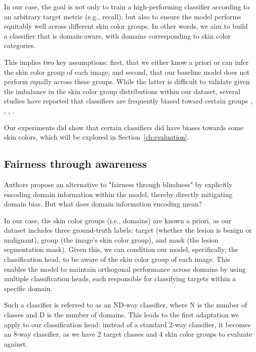 In our case, the goal is not only to train a high-performing classifier according to an arbitrary target metric (e.g., recall), but also to ensure the model performs equitably well across different skin color groups. In other words, we aim to build a classifier that is domain-aware, with domains corresponding to skin color categories.

This implies two key assumptions: first, that we either know a priori or can infer the skin color group of each image; and second, that our baseline model does not perform equally across these groups. While the latter is difficult to validate given the imbalance in the skin color group distributions within our dataset, several studies have reported that classifiers are frequently biased toward certain groups \cite{skin_color_debiasing}, \cite{skin_color_bias_ferit}, \cite{assessing_bias_in_classifiers}, \cite{domain_aware_fairness}.

Our experiments did show that certain classifiers did have biases towards some skin colors, which will be explored in Section~\ref{ch:evaluation}.

\subsection{Fairness through awareness}
Authors \cite{fairness_through_awarness} propose an alternative to "fairness through blindness" by explicitly encoding domain information within the model, thereby directly mitigating domain bias. But what does domain information encoding mean?

In our case, the skin color groups (i.e., domains) are known a priori, as our dataset includes three ground-truth labels: target (whether the lesion is benign or malignant), group (the image's skin color group), and mask (the lesion segmentation mask). Given this, we can condition our model, specifically, the classification head, to be aware of the skin color group of each image. This enables the model to maintain orthogonal performance across domains by using multiple classification heads, each responsible for classifying targets within a specific domain.

Such a classifier is referred to as an ND-way classifier, where N is the number of classes and 
D is the number of domains. This leads to the first adaptation we apply to our classification head: instead of a standard 2-way classifier, it becomes an 8-way classifier, as we have 2 target classes and 4 skin color groups to evaluate against.

